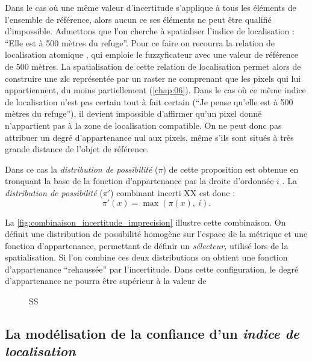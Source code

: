 Dans le cas où une même valeur d'incertitude s'applique à tous les
éléments de l'ensemble de référence, alors aucun ce ses éléments ne
peut être qualifié d'impossible.
%
Admettons que l'on cherche à spatialiser l'indice de localisation :
\enquote{Elle est à 500 mètres du refuge}. Pour ce faire on recourra
la relation de localisation atomique
, qui emploie le fuzzyficateur
 avec une valeur de référence de 500 mètres. La
spatialisation de cette relation de localisation permet alors de
construire une \ac{zlc} représentée par un raster ne comprenant que
les pixels qui lui appartiennent, du moins partiellement
(\autoref{chap:06}). Dans le cas où ce même indice de localisation
n'est pas certain tout à fait certain (\eg \enquote{Je pense qu'elle
  est à 500 mètres du refuge}), il devient impossible d'affirmer qu'un
pixel donné n'appartient pas à la zone de localisation compatible. On
ne peut donc pas attribuer un degré d'appartenance nul aux pixels,
même s'ils sont situés à très grande distance de l'objet de référence.

Dans ce cas la \emph{distribution de possibilité} (\(π\)) de cette
proposition est obtenue en tronquant la base de la fonction
d'appartenance par la droite d'ordonnée \(i\)
\autocite{Bouchon-Meunier2007}. La \emph{distribution de possibilité}
(\(π'\)) combinant incerti XX est donc :
%
\begin{equation}
  π'(x) = \max(π(x),\ i).  
\end{equation}

La \autoref{fig:combinaison_incertitude_imprecision} illustre cette
combinaison. On définit une distribution de possibilité homogène sur
l'espace de la métrique et une fonction d'appartenance, permettant de
définir un \emph{sélecteur,} utilisé lors de la spatialisation. Si
l'on combine ces deux distributions on obtient une fonction
d'appartenance \enquote{rehaussée} par l'incertitude. Dans cette
configuration, le degré d'appartenance ne pourra être supérieur à la
valeur de 

\begin{figure}
  \centering
  
  \caption{SS}
  \label{fig:combinaison_incertitude_imprecision}
\end{figure}

\subsection{La modélisation de la confiance d'un \emph{indice de
    localisation}}


